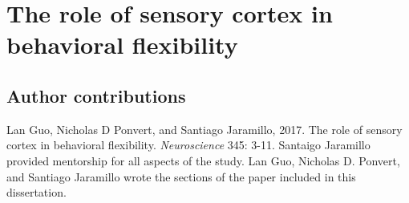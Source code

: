 \newcommand{\Tasks}{1}
\newcommand{\StimOutcome}{\Tasks A}
\newcommand{\StimAction}{\Tasks B}
\newcommand{\FeatureRelevance}{\Tasks C}

\newcommand{\Mechanisms}{2}
\newcommand{\LTP}{\Tasks A}
\newcommand{\TopDown}{\Tasks A}

\chapter{The role of sensory cortex in behavioral flexibility}

\section{Author contributions}
\noindent Lan Guo, Nicholas D Ponvert, and Santiago Jaramillo, 2017. The role of sensory cortex in behavioral flexibility. \textit{Neuroscience} 345: 3-11. 
%
Santaigo Jaramillo provided mentorship for all aspects of the study. Lan Guo, Nicholas D. Ponvert, and Santiago Jaramillo wrote the sections of the paper included in this dissertation.



